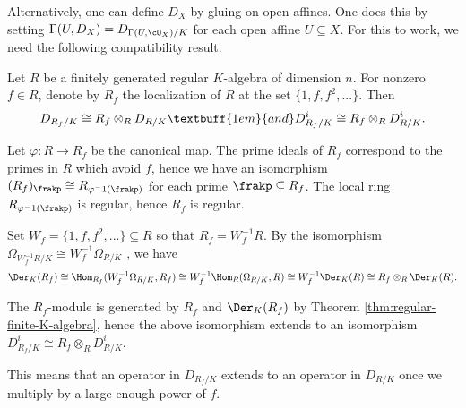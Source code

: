 Alternatively, one can define $D_X$ by gluing on open affines. One does this by setting $\Gamma(U,D_X) = D_{\Gamma(U,\cO_X)/K}$ for each open affine $U \subseteq X$. For this to work, we need the following compatibility result:
\begin{prop}\label{prop:compatability}
	Let $R$ be a finitely generated regular $K$-algebra of dimension $n$. For nonzero $f \in R$, denote by $R_f$ the localization of $R$ at the set $\{1,f,f^2,...\}$. Then
	\begin{align*}
		D_{R_f/K} \cong R_f \otimes_R D_{R/K} \textbuff{1em}{and} D^i_{R_f/K} \cong R_f \otimes_R D^i_{R/K}.
	\end{align*}
\end{prop}
\begin{prf}
	Let $\varphi:R\to R_f$ be the canonical map. The prime ideals of $R_f$ correspond to the primes in $R$ which avoid $f$, hence we have an isomorphism $(R_f)_\frakp\cong R_{\varphi^-1(\frakp)}$ for each prime $\frakp \subseteq R_f$. The local ring $R_{\varphi^-1(\frakp)}$ is regular, hence $R_f$ is regular.

	Set $W_f = \{1,f,f^2,...\}\subseteq R$ so that $R_f = W^{-1}_fR$. By the isomorphism $\Omega_{W_f^{-1}R/K} \cong W^{-1}_f\Omega_{R/K}$ \cite[Proposition 2.8.3]{hartshorne}, we have
	\begin{align*}
		\Der_K(R_f) \cong \Hom_{R_f}(W^{-1}_f\Omega_{R/K},R_f) \cong W^{-1}_f\Hom_{R}(\Omega_{R/K}, R) \cong W^{-1}_f\Der_K(R) \cong R_f\otimes_R\Der_K(R).
	\end{align*}
	
	The $R_f$-module is generated by $R_f$ and $\Der_K(R_f)$ by Theorem \ref{thm:regular-finite-K-algebra}, hence the above isomorphism extends to an isomorphism $D^i_{R_f/K}\cong R_f\otimes_R D^i_{R/K}$.
\end{prf}

This means that an operator in $D_{R_f/K}$ extends to an operator in $D_{R/K}$ once we multiply by a large enough power of $f$.

\bigskip

